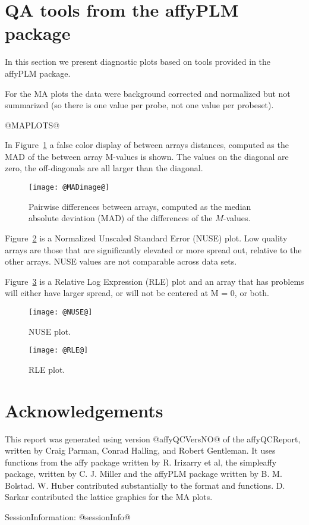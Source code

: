 \documentclass[11pt]{article}
\newcommand{\Rpackage}[1]{{\textsf{#1}}}
\begin{document}
\section{QA tools from the \Rpackage{affyPLM} package}

In this section we present diagnostic plots based on tools provided
in the \Rpackage{affyPLM} package.

For the MA plots the data were background corrected and normalized 
but not summarized (so there is one value per probe, not one value
per probeset). 

@MAPLOTS@

In Figure~\ref{fig:MADimage} a false color display of between arrays
distances, computed as the MAD of the between array M-values is shown.
The values on the diagonal are zero, the off-diagonals are all larger
than the diagonal.

\begin{figure}[tp]
  \centering
\texttt{[image: @MADimage@]}
\caption{\label{fig:MADimage}%
Pairwise differences between arrays, computed as the median absolute 
deviation (MAD) of the differences of the $M$-values.}
\end{figure}

Figure~\ref{fig:NUSE} is a Normalized Unscaled Standard Error (NUSE) 
plot.  Low quality arrays are those that are significantly elevated or 
more spread out, relative to the other arrays.
NUSE values are not comparable across data sets.

Figure~\ref{fig:RLE} is a Relative Log Expression (RLE) plot
and an array that has problems will either have larger spread, or 
will not be centered at M = 0, or both.

\begin{figure}[tp]
  \centering
\texttt{[image: @NUSE@]}
\caption{\label{fig:NUSE}%
NUSE plot.}
\end{figure}

\begin{figure}[tp]
  \centering
\texttt{[image: @RLE@]}
\caption{\label{fig:RLE}%
RLE plot.}
\end{figure}

\section*{Acknowledgements}
\label{sec:ack}

This report was generated using version @affyQCVersNO@ of the 
\Rpackage{affyQCReport}, written by Craig Parman, Conrad Halling, and
Robert Gentleman. It uses functions from the \Rpackage{affy} package
written by R. Irizarry et al, the \Rpackage{simpleaffy} package, written
by C. J. Miller and the \Rpackage{affyPLM} package written by B. M. Bolstad.
W. Huber contributed substantially to the format and functions.
D. Sarkar contributed the lattice graphics for the MA plots.

SessionInformation: 
@sessionInfo@
\end{document}
